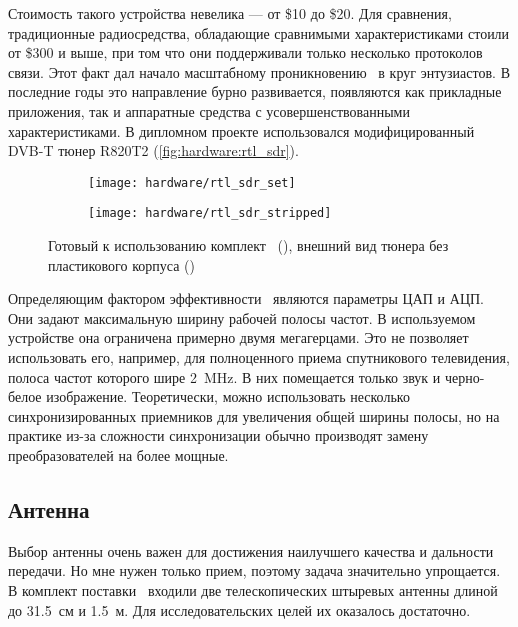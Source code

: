 Стоимость такого устройства невелика --- от \$10 до \$20. Для сравнения, традиционные радиосредства, обладающие сравнимыми характеристиками стоили от \$300 и выше, при том что они поддерживали только несколько протоколов связи. Этот факт дал начало масштабному проникновению \SDR\ в круг энтузиастов. В последние годы это направление бурно развивается, появляются как прикладные приложения, так и аппаратные средства с усовершенствованными характеристиками. В дипломном проекте использовался модифицированный DVB-T тюнер R820T2 (\autoref{fig:hardware:rtl_sdr}).

\begin{figure}[h]
  \centering
  \begin{subfigure}{0.45\textwidth}
    \texttt{[image: hardware/rtl\_sdr\_set]}
    \caption{}
    \label{fig:hardware:rtl_sdr_set}
  \end{subfigure}
  \begin{subfigure}{0.45\textwidth}
    \texttt{[image: hardware/rtl\_sdr\_stripped]}
    \caption{}
    \label{fig:hardware:rtl_sdr_stripped}
  \end{subfigure}
  \caption{Готовый к использованию комплект \sdr\ (), внешний вид тюнера без пластикового корпуса ()}
  \label{fig:hardware:rtl_sdr}
\end{figure}

Определяющим фактором эффективности \SDR\ являются параметры ЦАП и АЦП. Они задают максимальную ширину рабочей полосы частот. В используемом устройстве она ограничена примерно двумя мегагерцами. Это не позволяет использовать его, например, для полноценного приема спутникового телевидения, полоса частот которого шире \SI{2}{\mega\hertz}. В них помещается только звук и черно-белое изображение. Теоретически, можно использовать несколько синхронизированных приемников для увеличения общей ширины полосы, но на практике из-за сложности синхронизации обычно производят замену преобразователей на более мощные.

\subsection{Антенна}

Выбор антенны очень важен для достижения наилучшего качества и дальности передачи. Но мне нужен только прием, поэтому задача значительно упрощается.
В комплект поставки \SDR\ входили две телескопических штыревых антенны длиной до \SI{31.5}{см} и \SI{1.5}{м}. Для исследовательских целей их оказалось достаточно.

